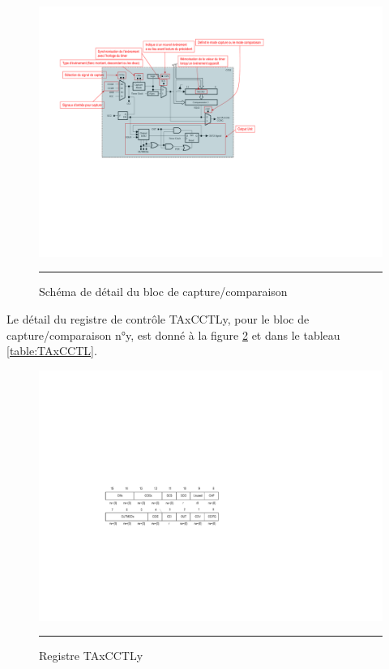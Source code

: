 \begin{figure}[h]
  \centering
  \includegraphics[angle=0, width=16cm]{./Figures/Chap5_Timer/Timer_Detail_2.pdf}
  \rule{35em}{0.5pt}
  \caption[TimerCCR]{Schéma de détail du bloc de capture/comparaison}
  \label{fig:TimerCCR}
\end{figure}

Le détail du registre de contrôle TAxCCTLy, pour le bloc de capture/comparaison n°y, est donné à la figure \ref{fig:TAxCCTLy} et dans le tableau \ref{table:TAxCCTL}. 

\begin{figure}[H]
  \centering
  \includegraphics[angle=0, width=13cm]{./Figures/Chap5_Timer/TAxCCTLy.pdf}
  \rule{35em}{0.5pt}
  \caption[TAxCCTLy]{Registre TAxCCTLy}
  \label{fig:TAxCCTLy}
\end{figure}


